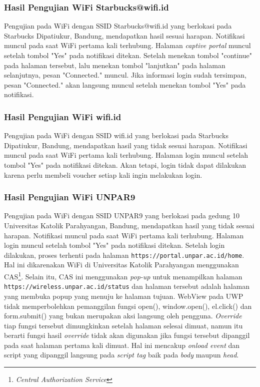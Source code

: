 \subsubsection{Hasil Pengujian WiFi Starbucks@wifi.id}
\label{subsubsec:starbucks_wifi_id}

Pengujian pada WiFi dengan SSID Starbucks@wifi.id yang berlokasi pada Starbucks Dipatiukur, Bandung, mendapatkan hasil sesuai harapan. Notifikasi muncul pada saat WiFi pertama kali terhubung. Halaman \textit{captive portal} muncul setelah tombol "Yes" pada notifikasi ditekan. Setelah menekan tombol "continue" pada halaman tersebut, lalu menekan tombol "lanjutkan" pada halaman selanjutnya, pesan "Connected." muncul. Jika informasi login sudah tersimpan, pesan "Connected." akan langsung muncul setelah menekan tombol "Yes" pada notifikasi.

\subsubsection{Hasil Pengujian WiFi wifi.id}
\label{subsubsec:wifi_id}

Pengujian pada WiFi dengan SSID wifi.id yang berlokasi pada Starbucks Dipatiukur, Bandung, mendapatkan hasil yang tidak sesuai harapan. Notifikasi muncul pada saat WiFi pertama kali terhubung. Halaman login muncul setelah tombol "Yes" pada notifikasi ditekan. Akan tetapi, login tidak dapat dilakukan karena perlu membeli voucher setiap kali ingin melakukan login.

\subsubsection{Hasil Pengujian WiFi UNPAR9}
\label{subsubsec:unpar9}

Pengujian pada WiFi dengan SSID UNPAR9 yang berlokasi pada gedung 10 Universitas Katolik Parahyangan, Bandung, mendapatkan hasil yang tidak sesuai harapan. Notifikasi muncul pada saat WiFi pertama kali terhubung. Halaman login muncul setelah tombol "Yes" pada notifikasi ditekan. Setelah login dilakukan, proses terhenti pada halaman \texttt{https://portal.unpar.ac.id/home}. Hal ini dikarenakan WiFi di Universitas Katolik Parahyangan menggunakan CAS\footnote{\textit{Central Authorization Service}}. Selain itu, CAS ini menggunakan \textit{pop-up} untuk menampilkan halaman \texttt{https://wireless.unpar.ac.id/status} dan halaman tersebut adalah halaman yang membuka popup yang menuju ke halaman tujuan. WebView pada UWP tidak memperbolehkan pemanggilan fungsi open(), window.open(), el.click() dan form.submit() yang bukan merupakan aksi langsung oleh pengguna. \textit{Override} tiap fungsi tersebut dimungkinkan setelah halaman selesai dimuat, namun itu berarti fungsi hasil \textit{override} tidak akan digunakan jika fungsi tersebut dipanggil pada saat halaman pertama kali dimuat. Hal ini mencakup \textit{onload event} dan script yang dipanggil langsung pada \textit{script tag} baik pada \textit{body} maupun \textit{head}.

